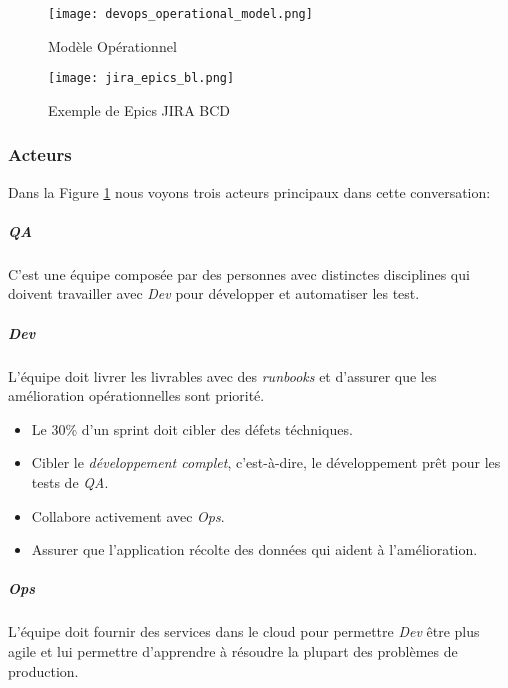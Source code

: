 \begin{figure}[!ht]
\centering
\texttt{[image: devops\_operational\_model.png]}
\caption{Modèle Opérationnel \cite{IsaacSacolick2016DrivingCulture}}
\label{fig:devops_operational_model}
\end{figure}

\begin{figure}[!ht]
\centering
\texttt{[image: jira\_epics\_bl.png]}
\caption{Exemple de Epics JIRA BCD}
\label{fig:example_epic}
\end{figure}



\subsubsection{Acteurs}
Dans la Figure \ref{fig:devops_operational_model} nous voyons trois acteurs principaux dans cette conversation:

\subparagraph{QA}
C'est une équipe composée par des personnes avec distinctes disciplines qui doivent travailler avec \textit{Dev} pour développer et automatiser les test.
\subparagraph{Dev} L'équipe doit livrer les livrables avec des \emph{runbooks} et d'assurer que les amélioration opérationnelles sont priorité.
\begin{itemize}
  \item Le 30\% d'un sprint doit cibler des défets téchniques.
  \item Cibler le \emph{développement complet}, c'est-à-dire, le développement prêt pour les tests de \textit{QA}.
  \item Collabore activement avec \textit{Ops}.
  \item Assurer que l'application récolte des données qui aident à l'amélioration.
\end{itemize}
\subparagraph{Ops}
L'équipe doit fournir des services dans le cloud pour permettre \textit{Dev} être plus agile et lui permettre d'apprendre à résoudre la plupart des problèmes de production.

